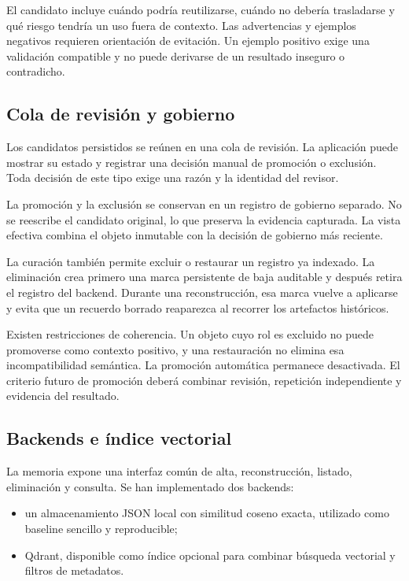 El candidato incluye cuándo podría reutilizarse, cuándo no debería trasladarse
y qué riesgo tendría un uso fuera de contexto. Las advertencias y ejemplos
negativos requieren orientación de evitación. Un ejemplo positivo exige una
validación compatible y no puede derivarse de un resultado inseguro o
contradicho.

\subsection{Cola de revisión y gobierno}

Los candidatos persistidos se reúnen en una cola de revisión. La aplicación
puede mostrar su estado y registrar una decisión manual de promoción o
exclusión. Toda decisión de este tipo exige una razón y la identidad del
revisor.

La promoción y la exclusión se conservan en un registro de gobierno separado.
No se reescribe el candidato original, lo que preserva la evidencia capturada.
La vista efectiva combina el objeto inmutable con la decisión de gobierno más
reciente.

La curación también permite excluir o restaurar un registro ya indexado. La
eliminación crea primero una marca persistente de baja auditable y después
retira el registro del backend. Durante una reconstrucción, esa marca vuelve a aplicarse y
evita que un recuerdo borrado reaparezca al recorrer los artefactos históricos.

Existen restricciones de coherencia. Un objeto cuyo rol es excluido no puede
promoverse como contexto positivo, y una restauración no elimina esa
incompatibilidad semántica. La promoción automática permanece desactivada. El
criterio futuro de promoción deberá combinar revisión, repetición independiente
y evidencia del resultado.

\subsection{Backends e índice vectorial}

La memoria expone una interfaz común de alta, reconstrucción, listado,
eliminación y consulta. Se han implementado dos backends:

\begin{itemize}
  \item un almacenamiento JSON local con similitud coseno exacta, utilizado
        como baseline sencillo y reproducible;
  \item Qdrant, disponible como índice opcional para combinar búsqueda
        vectorial y filtros de metadatos.
\end{itemize}

